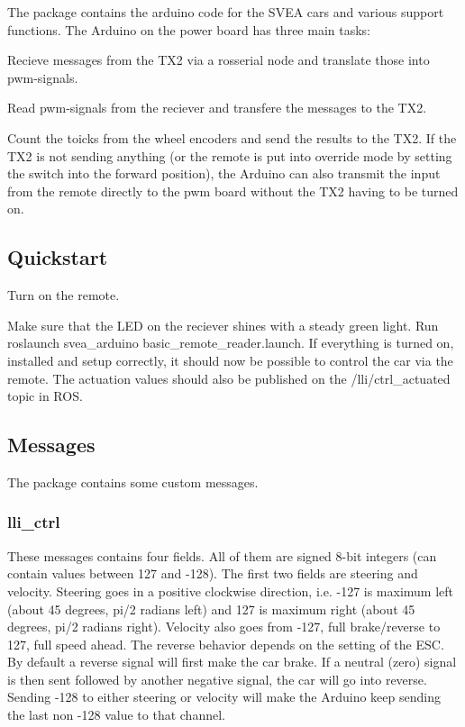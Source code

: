 The package contains the arduino code for the S\+V\+EA cars and various support functions. The Arduino on the power board has three main tasks\+:
\begin{DoxyEnumerate}
\item Recieve messages from the T\+X2 via a rosserial node and translate those into pwm-\/signals.
\item Read pwm-\/signals from the reciever and transfere the messages to the T\+X2.
\item Count the toicks from the wheel encoders and send the results to the T\+X2. If the T\+X2 is not sending anything (or the remote is put into override mode by setting the switch into the forward position), the Arduino can also transmit the input from the remote directly to the pwm board without the T\+X2 having to be turned on.
\end{DoxyEnumerate}

\subsection*{Quickstart}


\begin{DoxyEnumerate}
\item Turn on the remote.
\item Make sure that the L\+ED on the reciever shines with a steady green light. Run {\ttfamily roslaunch svea\+\_\+arduino basic\+\_\+remote\+\_\+reader.\+launch}. If everything is turned on, installed and setup correctly, it should now be possible to control the car via the remote. The actuation values should also be published on the {\ttfamily /lli/ctrl\+\_\+actuated} topic in R\+OS.
\end{DoxyEnumerate}

\subsection*{Messages}

The package contains some custom messages. \subsubsection*{lli\+\_\+ctrl}

These messages contains four fields. All of them are signed 8-\/bit integers (can contain values between 127 and -\/128). The first two fields are {\ttfamily steering} and {\ttfamily velocity}. Steering goes in a positive clockwise direction, i.\+e. -\/127 is maximum left (about 45 degrees, pi/2 radians left) and 127 is maximum right (about 45 degrees, pi/2 radians right). Velocity also goes from -\/127, full brake/reverse to 127, full speed ahead. The reverse behavior depends on the setting of the E\+SC. By default a reverse signal will first make the car brake. If a neutral (zero) signal is then sent followed by another negative signal, the car will go into reverse. Sending -\/128 to either steering or velocity will make the Arduino keep sending the last non -\/128 value to that channel.

